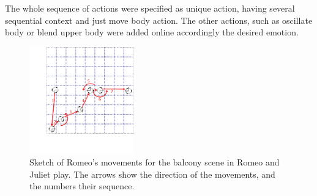 The whole sequence of actions were specified as unique action, having several sequential context and just move body action. The other actions, such as oscillate body or blend upper body were added online accordingly the desired emotion.  
\begin{figure}
	\centering
	\includegraphics[width=0.4\textwidth]{./Images/FourthCaseSceneB.png}
	\caption{Sketch of Romeo's movements for the balcony scene in Romeo and Juliet play. The arrows show the direction of the movements, and the numbers their sequence.}
	\label{fig:triskar_test}
\end{figure} 
